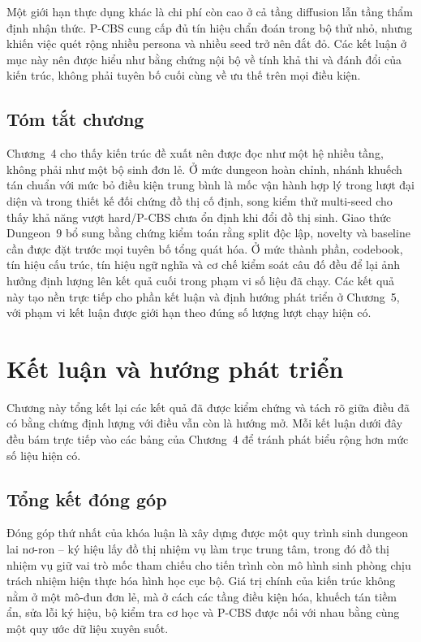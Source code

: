 \documentclass[oneside,a4paper,12pt]{extreport}
\begin{document}
Một giới hạn thực dụng khác là chi phí còn cao ở cả tầng diffusion lẫn tầng thẩm định nhận thức. P-CBS cung cấp đủ tín hiệu chẩn đoán trong bộ thử nhỏ, nhưng khiến việc quét rộng nhiều persona và nhiều seed trở nên đắt đỏ. Các kết luận ở mục này nên được hiểu như bằng chứng nội bộ về tính khả thi và đánh đổi của kiến trúc, không phải tuyên bố cuối cùng về ưu thế trên mọi điều kiện.

\section{Tóm tắt chương}
Chương~4 cho thấy kiến trúc đề xuất nên được đọc như một hệ nhiều tầng, không phải như một bộ sinh đơn lẻ. Ở mức dungeon hoàn chỉnh, nhánh khuếch tán chuẩn với mức bỏ điều kiện trung bình là mốc vận hành hợp lý trong lượt đại diện và trong thiết kế đối chứng đồ thị cố định, song kiểm thử multi-seed cho thấy khả năng vượt hard/P-CBS chưa ổn định khi đổi đồ thị sinh. Giao thức Dungeon~$9$ bổ sung bằng chứng kiểm toán rằng split độc lập, novelty và baseline cần được đặt trước mọi tuyên bố tổng quát hóa. Ở mức thành phần, codebook, tín hiệu cấu trúc, tín hiệu ngữ nghĩa và cơ chế kiểm soát câu đố đều để lại ảnh hưởng định lượng lên kết quả cuối trong phạm vi số liệu đã chạy. Các kết quả này tạo nền trực tiếp cho phần kết luận và định hướng phát triển ở Chương~5, với phạm vi kết luận được giới hạn theo đúng số lượng lượt chạy hiện có.

\chapter{Kết luận và hướng phát triển}
Chương này tổng kết lại các kết quả đã được kiểm chứng và tách rõ giữa điều đã có bằng chứng định lượng với điều vẫn còn là hướng mở. Mỗi kết luận dưới đây đều bám trực tiếp vào các bảng của Chương~4 để tránh phát biểu rộng hơn mức số liệu hiện có.

\section{Tổng kết đóng góp}
Đóng góp thứ nhất của khóa luận là xây dựng được một quy trình sinh dungeon lai nơ-ron -- ký hiệu lấy đồ thị nhiệm vụ làm trục trung tâm, trong đó đồ thị nhiệm vụ giữ vai trò mốc tham chiếu cho tiến trình còn mô hình sinh phòng chịu trách nhiệm hiện thực hóa hình học cục bộ. Giá trị chính của kiến trúc không nằm ở một mô-đun đơn lẻ, mà ở cách các tầng điều kiện hóa, khuếch tán tiềm ẩn, sửa lỗi ký hiệu, bộ kiểm tra cơ học và P-CBS được nối với nhau bằng cùng một quy ước dữ liệu xuyên suốt.
\end{document}
